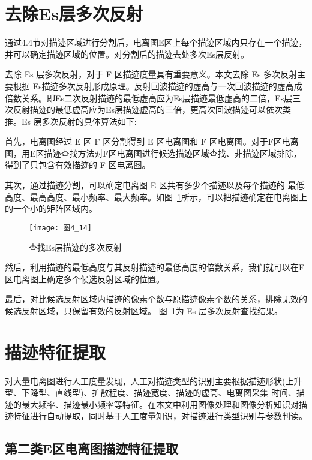 \section{去除Es层多次反射}
\label{4_5}
 
通过4.4节对描迹区域进行分割后，电离图E区上每个描迹区域内只存在一个描迹，并可以确定描迹区域的位置。对分割后的描迹去处多次Es层反射。

去除 Es 层多次反射，对于 F 区描迹度量具有重要意义。本文去除 Es 多次反射主要根据 Es描迹多次反射形成原理。反射回波描迹的虚高与一次回波描迹的虚高成倍数关系。即Es二次反射描迹的最低虚高应为Es层描迹最低虚高的二倍，Es层三次反射描迹的最低虚高应为Es层描迹虚高的三倍，更高次回波描迹可以依次类推。Es 层多次反射的具体算法如下:

首先，电离图经过 E 区 F 区分割得到 E 区电离图和 F 区电离图。对于F区电离图，用E区描迹查找方法对F区电离图进行候选描迹区域查找、非描迹区域排除，得到了只包含有效描迹的 F 区电离图。

其次，通过描迹分割，可以确定电离图 E 区共有多少个描迹以及每个描迹的 最低高度、最高高度、最小频率、最大频率。如图~\ref{图4_14}所示，可以把描迹确定在电离图上的一个小的矩阵区域内。

\begin{figure}[!ht]
\centering
\texttt{[image: 图4\_14]}
\caption{查找Es层描迹的多次反射}
\label{图4_14}
\end{figure}

然后，利用描迹的最低高度与其反射描迹的最低高度的倍数关系，我们就可以在F区电离图上确定多个候选反射区域的位置。

最后，对比候选反射区域内描迹的像素个数与原描迹像素个数的关系，排除无效的候选反射区域，只保留有效的反射区域。 图~\ref{图4_14}为 Es 层多次反射查找结果。


\section{描迹特征提取}
\label{4_5}


对大量电离图进行人工度量发现，人工对描迹类型的识别主要根据描迹形状(上升型、下降型、直线型)、扩散程度、描迹宽度、描迹的虚高、电离图采集 时间、描迹的最大频率、描迹最小频率等特征。在本文中利用图像处理和图像分析知识对描迹特征进行自动提取，同时基于人工度量知识，对描迹进行类型识别与参数判读。

\subsection{第二类E区电离图描迹特征提取}

